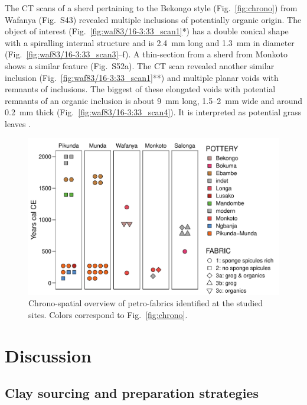 \documentclass[preprint,10pt,oneside,onecolumn,authoryear]{elsarticle}
\begin{document}
The {\textmu}CT scans of a sherd pertaining to the Bekongo style (Fig.~\ref{fig:chrono}) from Wafanya (Fig.~S43) revealed multiple inclusions of potentially organic origin. The object of interest (Fig.~\ref{fig:waf83/16-3:33_scan1}*) has a double conical shape with a spiralling internal structure and is 2.4~mm long and 1.3~mm in diameter (Fig.~\ref{fig:waf83/16-3:33_scan3}--f). A thin-section from a sherd from Monkoto shows a similar feature (Fig.~S52a). The {\textmu}CT scan revealed another similar inclusion (Fig.~\ref{fig:waf83/16-3:33_scan1}**) and multiple planar voids with remnants of inclusions. The biggest of these elongated voids with potential remnants of an organic inclusion is about 9~mm long, 1.5--2~mm wide and around 0.2~mm thick (Fig.~\ref{fig:waf83/16-3:33_scan4}). It is interpreted as potential grass leaves \citep[Fig.~S42c--d;][]{Toth.2023}.

\begin{figure}[!tb]
	\includegraphics[width=\textwidth]{Fig_Synthesis.pdf}
	\caption{Chrono-spatial overview of petro-fabrics identified at the studied sites. Colors correspond to Fig.~\ref{fig:chrono}.}
	\label{fig:synthesis}
\end{figure}

\section{Discussion}

\subsection{Clay sourcing and preparation strategies}
\end{document}

